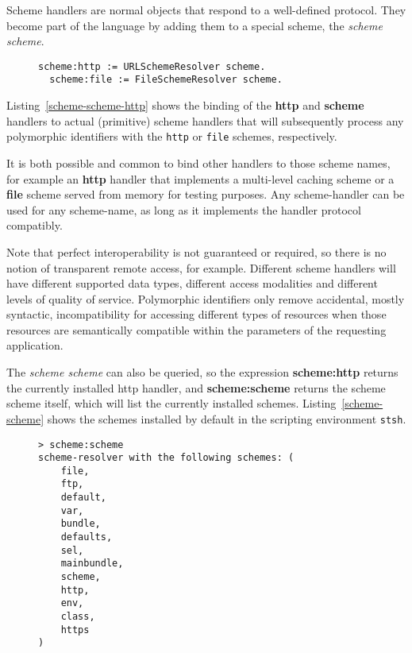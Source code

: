 \documentclass[preprint,authoryear]{acm_proc_article-sp}
\begin{document}
Scheme handlers are normal objects that respond to a well-defined protocol.  They
become part of the language by adding them to a special scheme, the {\em scheme scheme}.

\begin{figure}[htbp]
\begin{lstlisting}[style=L,label=scheme-scheme-http,caption=Adding the http and file schemes.]
  scheme:http := URLSchemeResolver scheme.
  scheme:file := FileSchemeResolver scheme.
\end{lstlisting}
\end{figure}

Listing~\ref{scheme-scheme-http} shows the binding of the {\bf http} and {\bf scheme}
handlers to actual (primitive) scheme handlers that will subsequently process any polymorphic
identifiers with the {\tt http} or {\tt file} schemes, respectively. 

It is both possible and common to bind other handlers to those scheme
names, for example an {\bf http} handler that implements a multi-level caching scheme
or a {\bf file} scheme served from memory for testing purposes.  Any scheme-handler
can be used for any scheme-name, as long as it implements the handler protocol
compatibly.

Note that perfect interoperability is not guaranteed or required, so there is no notion
of transparent remote access, for example.  Different scheme handlers will have different supported
data types, different access modalities and different levels of quality of service.
Polymorphic identifiers only remove accidental, mostly syntactic, incompatibility for accessing different types
of resources when those resources are semantically compatible within the parameters
of the requesting application.


The {\em scheme scheme} can also be queried,
so the expression {\bf scheme:http} returns the currently installed http handler, and 
{\bf scheme:scheme} returns the scheme scheme itself, which will list the currently
installed schemes.  Listing~\ref{scheme-scheme} shows the schemes installed by
default in the scripting environment {\tt stsh}.

\begin{figure}[htbp]
\begin{lstlisting}[style=L,label=scheme-scheme,caption=List of schemes via scheme:scheme.]
> scheme:scheme 
scheme-resolver with the following schemes: (
    file,
    ftp,
    default,
    var,
    bundle,
    defaults,
    sel,
    mainbundle,
    scheme,
    http,
    env,
    class,
    https
)
\end{lstlisting}
\end{figure}
\end{document}
